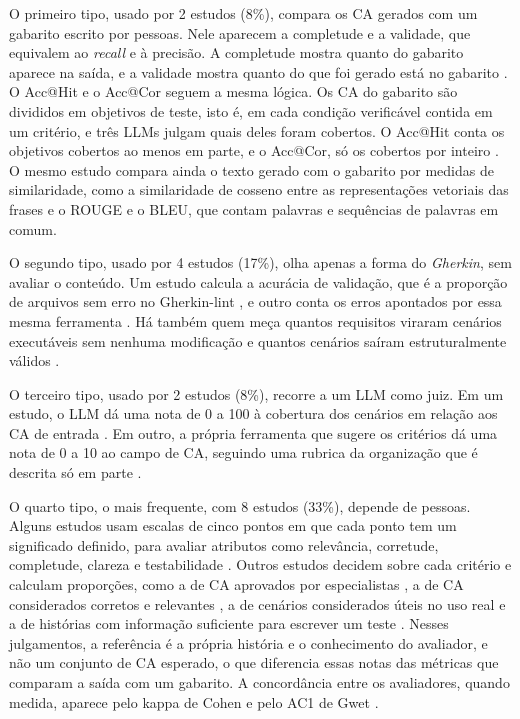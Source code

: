 O primeiro tipo, usado por 2 estudos (8\%), compara os CA gerados com um gabarito escrito por pessoas. Nele aparecem a completude e a validade, que equivalem ao \textit{recall} e à precisão. A completude mostra quanto do gabarito aparece na saída, e a validade mostra quanto do que foi gerado está no gabarito \cite{li2024}. O Acc@Hit e o Acc@Cor seguem a mesma lógica. Os CA do gabarito são divididos em objetivos de teste, isto é, em cada condição verificável contida em um critério, e três LLMs julgam quais deles foram cobertos. O Acc@Hit conta os objetivos cobertos ao menos em parte, e o Acc@Cor, só os cobertos por inteiro \cite{wang2025}. O mesmo estudo compara ainda o texto gerado com o gabarito por medidas de similaridade, como a similaridade de cosseno entre as representações vetoriais das frases e o ROUGE e o BLEU, que contam palavras e sequências de palavras em comum.

O segundo tipo, usado por 4 estudos (17\%), olha apenas a forma do \textit{Gherkin}, sem avaliar o conteúdo. Um estudo calcula a acurácia de validação, que é a proporção de arquivos sem erro no Gherkin-lint \cite{karpurapu2024}, e outro conta os erros apontados por essa mesma ferramenta \cite{matveeva2025}. Há também quem meça quantos requisitos viraram cenários executáveis sem nenhuma modificação \cite{zyberaj2026} e quantos cenários saíram estruturalmente válidos \cite{huang2026}.

O terceiro tipo, usado por 2 estudos (8\%), recorre a um LLM como juiz. Em um estudo, o LLM dá uma nota de 0 a 100 à cobertura dos cenários em relação aos CA de entrada \cite{huang2026}. Em outro, a própria ferramenta que sugere os critérios dá uma nota de 0 a 10 ao campo de CA, seguindo uma rubrica da organização que é descrita só em parte \cite{baker2026}.

O quarto tipo, o mais frequente, com 8 estudos (33\%), depende de pessoas. Alguns estudos usam escalas de cinco pontos em que cada ponto tem um significado definido, para avaliar atributos como relevância, corretude, completude, clareza e testabilidade \cite{wang2025,hassani2026,zhang2024}. Outros estudos decidem sobre cada critério e calculam proporções, como a de CA aprovados por especialistas \cite{schwedt2025}, a de CA considerados corretos e relevantes \cite{spijkman2025}, a de cenários considerados úteis no uso real \cite{ferreira2025} e a de histórias com informação suficiente para escrever um teste \cite{brockenbrough2025,brockenbrough2024}. Nesses julgamentos, a referência é a própria história e o conhecimento do avaliador, e não um conjunto de CA esperado, o que diferencia essas notas das métricas que comparam a saída com um gabarito. A concordância entre os avaliadores, quando medida, aparece pelo kappa de Cohen e pelo AC1 de Gwet \cite{li2024,schwedt2025}.

